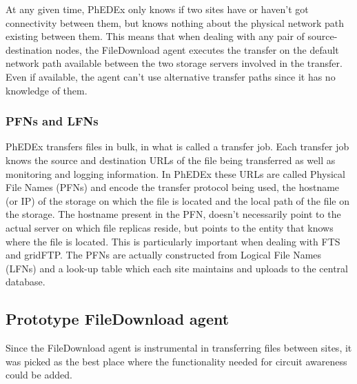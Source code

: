 At any given time, PhEDEx only knows if two sites have or haven't got connectivity
between them, but knows nothing about the physical network path existing between
them. This means that when dealing with any pair of source-destination nodes, 
the FileDownload agent executes the transfer on the default network path available 
between the two storage servers involved in the transfer. Even if available, the agent
 can't use alternative transfer paths since it has no knowledge of them.

\subsubsection{PFNs and LFNs}

PhEDEx transfers files in bulk, in what is called a transfer job. Each transfer job
knows the source and destination URLs of the file being transferred as well as 
monitoring and logging information. In PhEDEx these URLs are called Physical
File Names (PFNs) and encode the transfer protocol being used, the hostname (or IP)
of the storage on which the file is located and the local path of the file
on the storage. 
The hostname present in the PFN, doesn't necessarily point to the
actual server on which file replicas reside, but points to the entity that knows where 
the file is located. This is particularly important when dealing with FTS\cite{FTS} 
and gridFTP.
The PFNs are actually constructed from Logical File Names (LFNs) and a look-up table
which each site maintains and uploads to the central database.

\subsection{Prototype FileDownload agent}

Since the FileDownload agent is instrumental in transferring files between sites, it was 
picked as the best place where the functionality needed for circuit awareness could be added.

